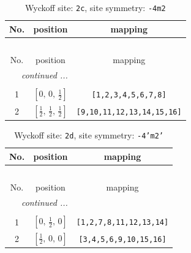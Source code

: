 \documentclass[fleqn,8pt]{jsarticle}
\begin{document}
\renewcommand{\arraystretch}{1.2}
\begin{longtable}{ccc}
\caption{Wyckoff site: {\tt 2c}, site symmetry: {\tt -4m2}}
 \\
 \hline \hline
No. & position & mapping \\ \hline \endfirsthead

\multicolumn{2}{l}{\tablename\ \thetable{}} \\
 \hline \hline
No. & position & mapping \\ \hline \endhead

 \hline \hline
\multicolumn{2}{r}{\footnotesize\it continued ...} \\ \endfoot

 \hline \hline
\multicolumn{2}{r}{} \\ \endlastfoot

1 & $\left[ 0,\, 0,\, \frac{1}{2} \right]$ & {\tt [1,2,3,4,5,6,7,8]} \\ \hline
2 & $\left[ \frac{1}{2},\, \frac{1}{2},\, \frac{1}{2} \right]$ & {\tt [9,10,11,12,13,14,15,16]} \\
\end{longtable}
\renewcommand{\arraystretch}{1.2}
\begin{longtable}{ccc}
\caption{Wyckoff site: {\tt 2d}, site symmetry: {\tt -4'm2'}}
 \\
 \hline \hline
No. & position & mapping \\ \hline \endfirsthead

\multicolumn{2}{l}{\tablename\ \thetable{}} \\
 \hline \hline
No. & position & mapping \\ \hline \endhead

 \hline \hline
\multicolumn{2}{r}{\footnotesize\it continued ...} \\ \endfoot

 \hline \hline
\multicolumn{2}{r}{} \\ \endlastfoot

1 & $\left[ 0,\, \frac{1}{2},\, 0 \right]$ & {\tt [1,2,7,8,11,12,13,14]} \\ \hline
2 & $\left[ \frac{1}{2},\, 0,\, 0 \right]$ & {\tt [3,4,5,6,9,10,15,16]} \\
\end{longtable}
\renewcommand{\arraystretch}{1.2}
\end{document}
